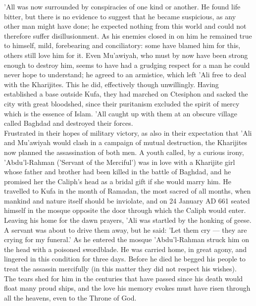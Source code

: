 \documentclass[11pt, b5paper, twoside]{book}
\begin{document}
'All was now surrounded by conspiracies of one kind or another. He found life bitter, but there is no evidence to suggest that he became suspicious, as any other man might have done; he expected nothing from this world and could not therefore suffer disillusionment. As his enemies closed in on him he remained true to himself, mild, forebearing and conciliatory: some have blamed him for this, others still love him for it. Even Mu'awiyah, who must by now have been strong enough to destroy him, seems to have had a grudging respect for a man he could never hope to understand; he agreed to an armistice, which left 'Ali free to deal with the Kharijites. This he did, effectively though unwillingly. Having established a base outside Kufa, they had marched on Ctesiphon and sacked the city with great bloodshed, since their puritanism excluded the spirit of mercy which is the essence of Islam. 'All caught up with them at an obscure village called Baghdad and destroyed their forces. \\

Frustrated in their hopes of military victory, as also in their expectation that 'Ali and Mu'awiyah would clash in a campaign of mutual destruction, the Kharijites now planned the assassination of both men. A youth called, by a curious irony, 'Abdu'l-Rahman ('Servant of the Merciful') was in love with a Kharijite girl whose father and brother had been killed in the battle of Baghdad, and he promised her the Caliph's head as a bridal gift if she would marry him. He travelled to Kufa in the month of Ramadan, the most sacred of all months, when mankind and nature itself should be inviolate, and on 24 January AD 661 seated himself in the mosque opposite the door through which the Caliph would enter. \\

Leaving his home for the dawn prayers, 'Ali was startled by the honking of geese. A servant was about to drive them away, but he said: 'Let them cry --- they are crying for my funeral.' As he entered the mosque 'Abdu'l-Rahman struck him on the head with a poisoned swordblade. He was carried home, in great agony, and lingered in this condition for three days. Before he died he begged his people to treat the assassin mercifully (in this matter they did not respect his wishes). \\

The tears shed for him in the centuries that have passed since his death would float many proud ships, and the love his memory evokes must have risen through all the heavens, even to the Throne of God. \\
\end{document}
